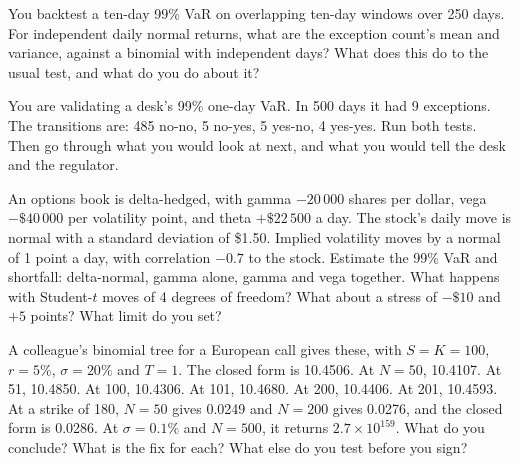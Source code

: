 \begin{question}\label{iq:iv2:risk-validation-and-regulation:37}
You backtest a ten-day 99\% VaR on overlapping ten-day windows over 250 days. For independent daily normal returns, what are the exception count's mean and variance, against a binomial with independent days? What does this do to the usual test, and what do you do about it?
\end{question}

\begin{question}\label{iq:iv2:risk-validation-and-regulation:38}
You are validating a desk's 99\% one-day VaR. In 500 days it had 9 exceptions. The transitions are: 485 no-no, 5 no-yes, 5 yes-no, 4 yes-yes. Run both tests. Then go through what you would look at next, and what you would tell the desk and the regulator.
\end{question}

\begin{question}\label{iq:iv2:risk-validation-and-regulation:39}
An options book is delta-hedged, with gamma $-20\,000$ shares per dollar, vega $-\$40\,000$ per volatility point, and theta $+\$22\,500$ a day. The stock's daily move is normal with a standard deviation of \$1.50. Implied volatility moves by a normal of 1 point a day, with correlation $-0.7$ to the stock. Estimate the 99\% VaR and shortfall: delta-normal, gamma alone, gamma and vega together. What happens with Student-$t$ moves of 4 degrees of freedom? What about a stress of $-\$10$ and $+5$ points? What limit do you set?
\end{question}

\begin{question}\label{iq:iv2:risk-validation-and-regulation:40}
A colleague's binomial tree for a European call gives these, with $S = K = 100$, $r = 5\%$, $\sigma = 20\%$ and $T = 1$. The closed form is 10.4506. At $N = 50$, 10.4107. At 51, 10.4850. At 100, 10.4306. At 101, 10.4680. At 200, 10.4406. At 201, 10.4593. At a strike of 180, $N = 50$ gives 0.0249 and $N = 200$ gives 0.0276, and the closed form is 0.0286. At $\sigma = 0.1\%$ and $N = 500$, it returns $2.7 \times 10^{159}$. What do you conclude? What is the fix for each? What else do you test before you sign?
\end{question}
